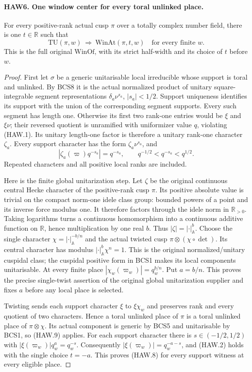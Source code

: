 \paragraph{HAW6. One window center for every toral unlinked place.}
\label{claim:HAW6}
For every positive-rank actual cusp $\pi$ over a totally
complex number field, there is one $t\in\mathbb R$ such that
\[
       \mathrm{TU}(\pi,w)\ \Longrightarrow\
                  \mathrm{WinAt}(\pi,t,w)
                        \quad\text{for every finite }w.
 \tag{HAW.8}
\]
This is the full original $\mathrm{WinOf}$, with its strict
half-width and its choice of $t$ before $w$.
\begin{proof}
First let $\sigma$ be a generic unitarisable local irreducible
whose support is toral and unlinked.  By BCS8 it is the actual
normalized product of unitary square-integrable segment
representations $\delta_a\nu^{s_a}$, $|s_a|<1/2$.
Support uniqueness identifies its support with the union of
the corresponding segment supports.  Every such segment has
length one.  Otherwise its first two rank-one entries would
be $\xi$ and $\xi\nu$; their reversed quotient is unramified
with uniformizer value $q$, violating (HAW.1).  Its unitary
length-one factor is therefore a unitary rank-one character
$\zeta_a$.  Every support character has the form
$\zeta_a\nu^{s_a}$, and
\[
             |\zeta_a(\varpi)q^{-s_a}|=q^{-s_a},
                     \qquad q^{-1/2}<q^{-s_a}<q^{1/2}.
 \tag{HAW.9}
\]
Repeated characters and all positive local ranks are included.

Here is the finite global unitarization step.  Let $\zeta$
be the original continuous central Hecke character of the
positive-rank cusp $\pi$.  Its positive absolute value is
trivial on the compact norm-one idele class group: bounded
powers of a point and its inverse force modulus one.
It therefore factors through the idele norm in
$\mathbb R_{>0}$.  Taking logarithms turns a continuous
homomorphism into a continuous additive function on
$\mathbb R$, hence multiplication by one real $b$.
Thus $|\zeta|=|\cdot|_{\mathbb A}^{b}$.
Choose the single character
$\chi=|\cdot|_{\mathbb A}^{-b/n}$ and the actual twisted
cusp $\pi\otimes(\chi\circ\det)$.  Its central character
has modulus $|\cdot|_{\mathbb A}^{b}\chi^n=1$.
This is the original normalized/unitary cuspidal class;
the cuspidal positive form in BCS1 makes its local
components unitarisable.  At every finite place
$|\chi_w(\varpi_w)|=q_w^{b/n}$.  Put $a=b/n$.
This proves the precise single-twist assertion of the
original global unitarization supplier and fixes $a$
before any local place is selected.

Twisting sends each support character $\xi$ to
$\xi\chi_w$ and preserves rank and every quotient of two
characters.  Hence a toral unlinked place of $\pi$ is a
toral unlinked place of $\pi\otimes\chi$.  Its actual
component is generic by BCS5 and unitarisable by BCS1, so
(HAW.9) applies.  For each support character there is
$s\in(-1/2,1/2)$ with
$|\xi(\varpi_w)|q_w^a=q_w^{-s}$.
Consequently $|\xi(\varpi_w)|=q_w^{-a-s}$, and (HAW.2)
holds with the single choice $t=-a$.  This proves (HAW.8)
for every support witness at every eligible place.
\end{proof}

